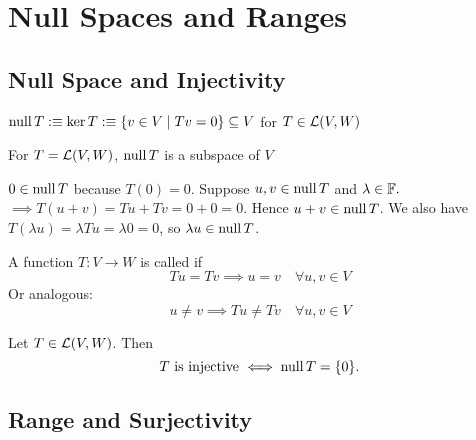 \section{Null Spaces and Ranges}

\subsection{Null Space and Injectivity}

\begin{mydef} 
  $\operatorname{null} T :\equiv \ker T :\equiv \{ v \in V \mid Tv=0\} \subseteq V$ for $T \in {\mathcal{L}(V,W)}$
\end{mydef}

\setcounter{thm}{12}
\begin{thm} 
  For $T=\mathcal{L}(V, W)$, $\operatorname{null} T$ is a subspace of $V$
\end{thm}
\begin{prf}
  $0 \in \operatorname{null} T$ because $T(0) = 0$. Suppose $u,v \in \operatorname{null} T$ and $\lambda \in \mathbb{F}.$ $\implies T(u+v)=Tu+Tv=0+0=0.$ Hence $u+v \in \operatorname{null} T$. We also have $T(\lambda u)= \lambda Tu = \lambda 0 = 0$, so $\lambda u \in \operatorname{null} T$.
\end{prf}

\setcounter{thm}{13}
\begin{mydef} [injectivity]
  \label{def: injectivity}
  A function $T: V \to W$ is called  if
  \begin{equation}
    Tu = Tv \implies u = v \quad \forall u,v \in V
  \end{equation}
  Or analogous:
  \begin{equation}
    u \neq v \implies Tu \neq Tv \quad \forall u,v \in V
  \end{equation}
\end{mydef}

\setcounter{thm}{14}
\begin{thm} 
  \label{thm: injectivity iff null space equals zero-set}
  Let $T \in \mathcal{L}(V,W)$. Then
  \begin{equation}
    T $ is injective $ \iff \mynull T = \{0 \}.
  \end{equation}
\end{thm}

\subsection{Range and Surjectivity}


